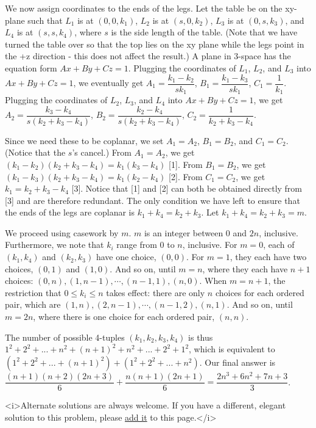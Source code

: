 \begin{enumerate}
 We now assign coordinates to the ends of the legs. Let the table be on the xy-plane such that $L_1$ is at $(0,0,k_1)$, $L_2$ is at $(s,0,k_2)$, $L_3$ is at $(0,s,k_3)$, and $L_4$ is at $(s,s,k_4)$, where $s$ is the side length of the table. (Note that we have turned the table over so that the top lies on the xy plane while the legs point in the +z direction - this does not affect the result.) A plane in 3-space has the equation form $Ax+By+Cz=1$. Plugging the coordinates of $L_1$, $L_2$, and $L_3$ into $Ax+By+Cz=1$, we eventually get $A_1=\dfrac{k_1-k_2}{sk_1}$, $B_1=\dfrac{k_1-k_3}{sk_1}$, $C_1=\dfrac{1}{k_1}$. Plugging the coordinates of $L_2$, $L_3$, and $L_4$ into $Ax+By+Cz=1$, we get $A_2=\dfrac{k_3-k_4}{s(k_2+k_3-k_4)}$, $B_2=\dfrac{k_2-k_4}{s(k_2+k_3-k_4)}$, $C_2=\dfrac{1}{k_2+k_3-k_4}$. 

 Since we need these to be coplanar, we set $A_1=A_2$, $B_1=B_2$, and $C_1=C_2$. (Notice that the $s$'s cancel.) From $A_1=A_2$, we get $(k_1-k_2)(k_2+k_3-k_4)=k_1(k_3-k_4)$ [1]. From $B_1=B_2$, we get $(k_1-k_3)(k_2+k_3-k_4)=k_1(k_2-k_4)$ [2]. From $C_1=C_2$, we get $k_1=k_2+k_3-k_4$ [3]. Notice that [1] and [2] can both be obtained directly from [3] and are therefore redundant. The only condition we have left to ensure that the ends of the legs are coplanar is $k_1+k_4=k_2+k_3$. Let $k_1+k_4=k_2+k_3=m$.

 We proceed using casework by $m$. $m$ is an integer between $0$ and $2n$, inclusive. Furthermore, we note that $k_i$ range from $0$ to $n$, inclusive. For $m=0$, each of $(k_1,k_4)$ and $(k_2,k_3)$ have one choice, $(0,0)$. For $m=1$, they each have two choices, $(0,1)$ and $(1,0)$. And so on, until $m=n$, where they each have $n+1$ choices: $(0,n),(1,n-1),\cdots,(n-1,1),(n,0)$. When $m=n+1$, the restriction that $0\le k_i\le n$ takes effect: there are only $n$ choices for each ordered pair, which are $(1,n),(2,n-1),\cdots,(n-1,2),(n,1)$. And so on, until $m=2n$, where there is one choice for each ordered pair, $(n,n)$.

 The number of possible 4-tuples $(k_1,k_2,k_3,k_4)$ is thus $1^2+2^2+...+n^2+(n+1)^2+n^2+...+2^2+1^2$, which is equivalent to $(1^2+2^2+...+(n+1)^2)+(1^2+2^2+...+n^2)$. Our final answer is $\dfrac{(n+1)(n+2)(2n+3)}{6}+\dfrac{n(n+1)(2n+1)}{6}=\boxed{\dfrac{2n^3+6n^2+7n+3}{3}}$.

 
<i>Alternate solutions are always welcome. If you have a different, elegant solution to this problem, please \href{https://artofproblemsolving.com/wiki/index.php?title=2005\_USAMO\_Problems/Problem\_4&action=edit}{add it} to this page.</i>




\end{enumerate}
